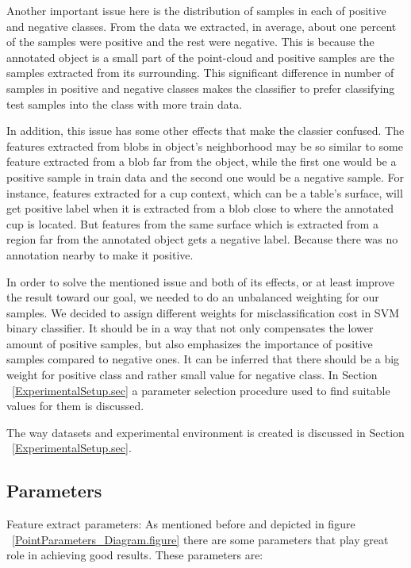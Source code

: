 Another important issue here is the distribution of samples in each of positive and negative classes. 
From the data we extracted, in average, about one percent of the samples were positive and the rest were negative.
This is because the annotated object is a small part of the point-cloud and positive samples are the samples extracted from its 
surrounding. 
This significant difference in number of samples in positive and negative classes makes the classifier to prefer classifying test samples into 
the class with more train data.

In addition, this issue has some other effects that make the classier confused. 
The features extracted from blobs in object's neighborhood may be so similar to some feature extracted from a blob far from the 
object, while the first one would be a positive sample in train data and the second one would be a negative sample. 
For instance, features extracted for a cup context, which can be a table's surface, will get positive label when it is extracted 
from a blob close to where the annotated cup is located. 
But features from the same surface which is extracted from a region far from the annotated object gets a negative label.
Because there was no annotation nearby to make it positive. 

In order to solve the mentioned issue and both of its effects, or at least improve the result toward our goal, we needed to do 
an unbalanced weighting for our samples. 
We decided to assign different weights for misclassification cost in SVM binary classifier. 
It should be in a way that not only compensates the lower amount of positive samples, but also emphasizes the importance of 
positive samples compared to negative ones. 
It can be inferred that there should be a big weight for positive class and rather small value for negative class.
In Section ~\ref{ExperimentalSetup.sec} a parameter selection procedure used to find suitable values for them is discussed.      

The way datasets and experimental environment is created is discussed in Section ~\ref{ExperimentalSetup.sec}.


\subsection{Parameters}
\label{Parameters.ssec}

Feature extract parameters:
As mentioned before and depicted in figure ~\ref{PointParameters_Diagram.figure} there are some parameters that play great role in
achieving good results. 
These parameters are:

